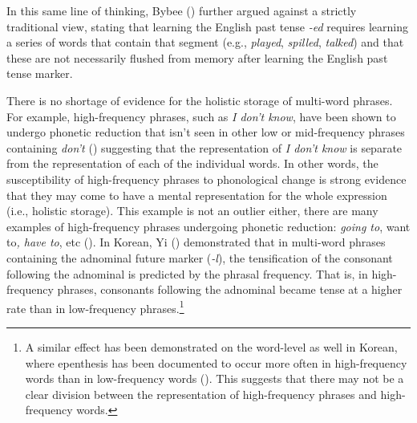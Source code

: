 \documentclass[
  12pt,
  letterpaper,
]{scrreprt}
\begin{document}
\noindent In this same line of thinking, Bybee
() further argued against a strictly
traditional view, stating that learning the English past tense
\emph{-ed} requires learning a series of words that contain that segment
(e.g., \emph{played}, \emph{spilled}, \emph{talked}) and that these are
not necessarily flushed from memory after learning the English past
tense marker.

There is no shortage of evidence for the holistic storage of multi-word
phrases. For example, high-frequency phrases, such as \emph{I don't
know}, have been shown to undergo phonetic reduction that isn't seen in
other low or mid-frequency phrases containing \emph{don't}
()
suggesting that the representation of \emph{I don't know} is separate
from the representation of each of the individual words. In other words,
the susceptibility of high-frequency phrases to phonological change is
strong evidence that they may come to have a mental representation for
the whole expression (i.e., holistic storage). This example is not an
outlier either, there are many examples of high-frequency phrases
undergoing phonetic reduction: \emph{going to}, want to\emph{, have to},
etc (). In Korean, Yi
() demonstrated that in multi-word
phrases containing the adnominal future marker (\emph{-l}), the
tensification of the consonant following the adnominal is predicted by
the phrasal frequency. That is, in high-frequency phrases, consonants
following the adnominal became tense at a higher rate than in
low-frequency phrases.\footnote{A similar effect has been demonstrated
  on the word-level as well in Korean, where epenthesis has been
  documented to occur more often in high-frequency words than in
  low-frequency words
  (). This suggests that there may not be a clear
  division between the representation of high-frequency phrases and
  high-frequency words.}
\end{document}
